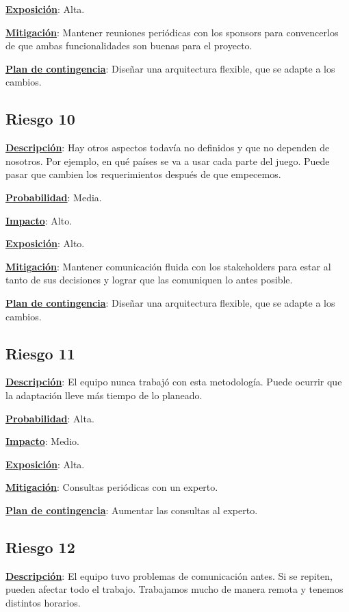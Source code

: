 \textbf{\underline{Exposición}}: Alta.

\textbf{\underline{Mitigación}}: Mantener reuniones periódicas con los sponsors para convencerlos de que ambas funcionalidades son buenas para el proyecto.

\textbf{\underline{Plan de contingencia}}: Diseñar una arquitectura flexible, que se adapte a los cambios.

\subsection*{Riesgo 10}
\textbf{\underline{Descripción}}: Hay otros aspectos todavía no definidos y que no dependen de nosotros. Por ejemplo, en qué países se va a usar cada parte del juego. Puede pasar que cambien los requerimientos después de que empecemos.

\textbf{\underline{Probabilidad}}: Media.

\textbf{\underline{Impacto}}: Alto.

\textbf{\underline{Exposición}}: Alto.

\textbf{\underline{Mitigación}}: Mantener comunicación fluida con los stakeholders para estar al tanto de sus decisiones y lograr que las comuniquen lo antes posible.

\textbf{\underline{Plan de contingencia}}: Diseñar una arquitectura flexible, que se adapte a los cambios.

\subsection*{Riesgo 11}
\textbf{\underline{Descripción}}: El equipo nunca trabajó con esta metodología. Puede ocurrir que la adaptación lleve más tiempo de lo planeado.

\textbf{\underline{Probabilidad}}: Alta.

\textbf{\underline{Impacto}}: Medio.

\textbf{\underline{Exposición}}: Alta.

\textbf{\underline{Mitigación}}: Consultas periódicas con un experto.

\textbf{\underline{Plan de contingencia}}: Aumentar las consultas al experto.

\subsection*{Riesgo 12}
\textbf{\underline{Descripción}}: El equipo tuvo problemas de comunicación antes. Si se repiten, pueden afectar todo el trabajo. Trabajamos mucho de manera remota y tenemos distintos horarios.

